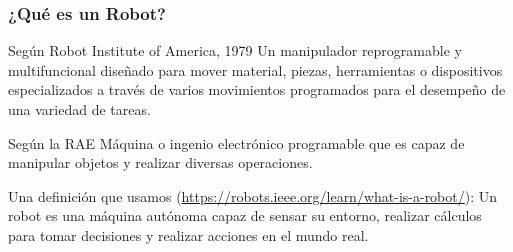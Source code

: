 \begin{frame}
    \frametitle{¿Qué es un Robot?}
   
    \begin{block}{Según Robot Institute of America, 1979}
        Un manipulador reprogramable y multifuncional diseñado para mover material, piezas, herramientas o dispositivos especializados a través de varios movimientos programados para el desempeño de una variedad de tareas.
    \end{block}
    
    \begin{block}{Según la RAE}
        Máquina o ingenio electrónico programable que es capaz de manipular objetos y realizar diversas operaciones.
    \end{block}
    
    \begin{block}{Una definición que usamos (\url{https://robots.ieee.org/learn/what-is-a-robot/}):}
        Un robot es una máquina autónoma capaz de sensar su entorno, realizar cálculos para tomar decisiones y realizar acciones en el mundo real.
    \end{block}
    
\end{frame}

